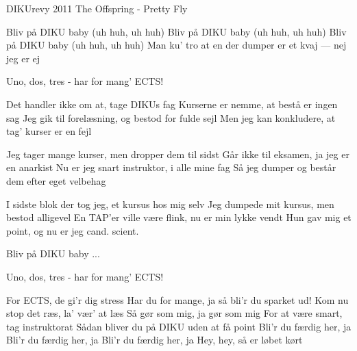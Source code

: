 {DIKUrevy 2011}
{The Offspring - Pretty Fly}
{
Bliv på DIKU baby (uh huh, uh huh)
Bliv på DIKU baby (uh huh, uh huh)
Bliv på DIKU baby (uh huh, uh huh)
Man ku' tro at en der dumper er et kvaj
\hspace*{3cm} --- nej jeg er ej



Uno, dos, tres - har for mang' ECTS!

Det handler ikke om at, tage DIKUs fag
Kurserne er nemme, at bestå er ingen sag
Jeg gik til forelæsning, og bestod for fulde sejl
Men jeg kan konkludere, at tag' kurser er en fejl


Jeg tager mange kurser, men dropper dem til sidst
Går ikke til eksamen, ja jeg er en anarkist
Nu er jeg snart instruktor, i alle mine fag
Så jeg dumper og består dem efter eget velbehag


I sidste blok der tog jeg, et kursus hos mig selv
Jeg dumpede mit kursus, men bestod alligevel
En TAP'er ville være flink, nu er min lykke vendt
Hun gav mig et point, og nu er jeg cand. scient.

Bliv på DIKU baby ...

Uno, dos, tres - har for mang' ECTS!

For ECTS, de gi'r dig stress
Har du for mange, ja så bli'r du sparket ud!
Kom nu stop det ræs, la' vær' at læs
Så gør som mig, ja gør som mig
For at være smart, tag instruktorat
Sådan bliver du på DIKU uden at få point
Bli'r du færdig her, ja
Bli'r du færdig her, ja
Bli'r du færdig her, ja
Hey, hey, så er løbet kørt
}